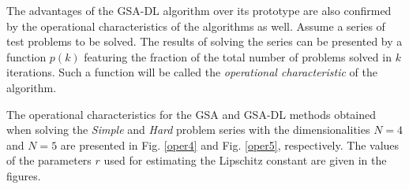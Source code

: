 \documentclass[runningheads]{llncs}
\begin{document}
The advantages of the GSA-DL algorithm over its prototype are also confirmed by the operational characteristics of the algorithms as well. Assume a series of test problems to be solved. The results of solving the series can be presented by a function $p(k)$ featuring the fraction of the total number of problems solved in $k$ iterations. Such a function will be called the \textit{operational characteristic} of the algorithm. 

The operational characteristics for the GSA and GSA-DL methods obtained when solving the \textit{Simple} and \textit{Hard} problem series with the dimensionalities $N=4$ and $N=5$ are presented in Fig. \ref{oper4} and Fig. \ref{oper5}, respectively. The values of the parameters $r$ used for estimating the Lipschitz constant are given in the figures.

\begin{figure}
\begin{minipage}{0.5\linewidth}
\end{minipage}
\hfill
\begin{minipage}{0.5\linewidth}

\end{minipage}
\end{figure}
\end{document}
